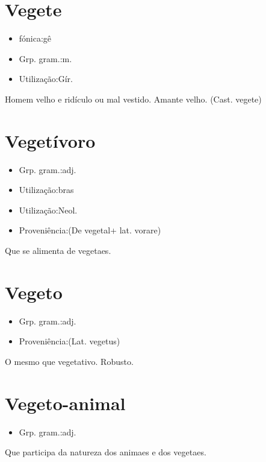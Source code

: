 \documentclass{article}
\begin{document}
\section{Vegete}
\begin{itemize}
\item {fónica:gê}
\end{itemize}
\begin{itemize}
\item {Grp. gram.:m.}
\end{itemize}
\begin{itemize}
\item {Utilização:Gír.}
\end{itemize}
Homem velho e ridículo ou mal vestido.
Amante velho.
(Cast. \textunderscore vegete\textunderscore )
\section{Vegetívoro}
\begin{itemize}
\item {Grp. gram.:adj.}
\end{itemize}
\begin{itemize}
\item {Utilização:bras}
\end{itemize}
\begin{itemize}
\item {Utilização:Neol.}
\end{itemize}
\begin{itemize}
\item {Proveniência:(De \textunderscore vegetal\textunderscore  + lat. \textunderscore vorare\textunderscore )}
\end{itemize}
Que se alimenta de vegetaes.
\section{Vegeto}
\begin{itemize}
\item {Grp. gram.:adj.}
\end{itemize}
\begin{itemize}
\item {Proveniência:(Lat. \textunderscore vegetus\textunderscore )}
\end{itemize}
O mesmo que \textunderscore vegetativo\textunderscore .
Robusto.
\section{Vegeto-animal}
\begin{itemize}
\item {Grp. gram.:adj.}
\end{itemize}
Que participa da natureza dos animaes e dos vegetaes.
\end{document}
